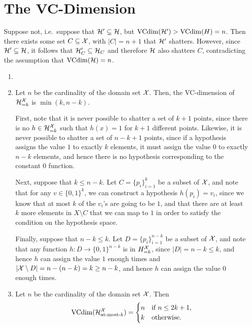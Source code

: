 \chapter{The VC-Dimension}

\begin{ex}
  Suppose not, i.e.\ suppose that $\mathcal{H}'\subseteq \mathcal{H}$, but $\operatorname*{VCdim}(\mathcal{H}')>\operatorname*{VCdim}(H)=n$. Then
  there exists some set $C\subseteq \mathcal{X}$, with $|C|=n+1$ that $\mathcal{H}'$ shatters.
  However, since $\mathcal{H}'\subseteq \mathcal{H}$, it follows that $\mathcal{H}'_C\subseteq \mathcal{H}_C$ and
  therefore $\mathcal{H}$ also shatters $C$, contradicting the assumption that $\operatorname*{VCdim}(\mathcal{H})=n$.
\end{ex}

\begin{ex}
  \begin{enumerate}
    \item[]
    \item Let $n$ be the cardinality of the domain set $\mathcal{X}$. Then, the
          VC-dimension of $\mathcal{H}^{\mathcal{X}}_{=k}$ is $\min(k, n-k)$.

          First, note that it is never possible to shatter a set of $k+1$ points, since there is no
          $h\in\mathcal{H}^{\mathcal{X}}_{=k}$ such that $h(x)=1$ for $k+1$ different points. Likewise,
          it is never possible to shatter a set of $n-k+1$ points, since if a
          hypothesis assigns the value $1$ to exactly $k$ elements, it must assign
          the value $0$ to exactly $n-k$ elements, and hence there is no hypothesis
          corresponding to the constant $0$ function.

          Next, suppose that $k\leq n-k$. Let $C=\{p_i\}_{i=1}^k$ be a subset of $\mathcal{X}$,
          and note that for any $v\in\{0,1\}^k$, we can construct a hypothesis $h(p_i)=v_i$, since we
          know that at most $k$ of the $v_i$'s are going to be $1$, and that there are
          at least $k$ more elements in $X\setminus C$ that we can map to $1$ in order to
          satisfy the condition on the hypothesis space.

          Finally, suppose that $n-k\leq k$. Let $D=\{p_i\}_{i=1}^{n-k}$ be a subset of $\mathcal{X}$,
          and note that any function $h:D\to \{0,1\}^{n-k}$ is in $H^{\mathcal{X}}_{=k}$, since
          $|D|=n-k\leq k$, and hence $h$ can assign the value $1$ enough times and
          $|\mathcal{X}\setminus D|=n-(n-k)=k\geq n-k$, and hence $h$ can assign the value $0$
          enough times.
    \item Let $n$ be the cardinality of the domain set $\mathcal{X}$. Then
          \begin{align*}
            \operatorname*{VCdim}(\mathcal{H}^{\mathcal{X}}_{\text{at-most-$k$}})=\begin{cases}
              n & \text{if $n\leq 2k+1$}, \\
              k & \text{otherwise}.
            \end{cases}
          \end{align*}


\end{enumerate}
\end{ex}
